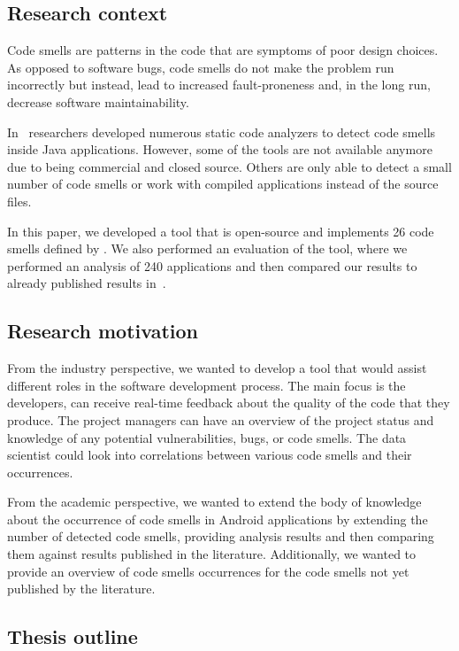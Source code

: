 \subsection{Research context}\label{subsec:research-context}

Code smells are patterns in the code that are symptoms of poor design choices.
As opposed to software bugs, code smells do not make the problem run incorrectly but
instead, lead to increased fault-proneness and, in the long run, decrease software maintainability.

In~\cite{mannan2016understanding, sonar-plugin-external, paprika-paper} researchers developed
numerous static code analyzers to detect code smells inside Java applications.
However, some of the tools are not available anymore due to being commercial and closed source.
Others are only able to detect a small number of code smells or work with compiled applications instead
of the source files.

In this paper, we developed a tool that is open-source and implements 26 code smells defined by \citeauthor{refactoring-fowler}.
We also performed an evaluation of the tool, where we performed an analysis of 240 applications and then
compared our results to already published results in~\cite{mannan2016understanding}.

\subsection{Research motivation}\label{subsec:research-motivation}

From the industry perspective, we wanted to develop a tool that would assist different roles in the software development process.
The main focus is the developers, can receive real-time feedback about the quality of the code that they produce.
The project managers can have an overview of the project status and knowledge of any potential vulnerabilities, bugs, or code smells.
The data scientist could look into correlations between various code smells and their occurrences.

From the academic perspective, we wanted to extend the body of knowledge about the occurrence of code smells in Android
applications by extending the number of detected code smells, providing analysis results and then comparing them against
results published in the literature.
Additionally, we wanted to provide an overview of code smells occurrences for the code smells not yet published by the
literature.

\subsection{Thesis outline}\label{subsec:thesis-outline}

